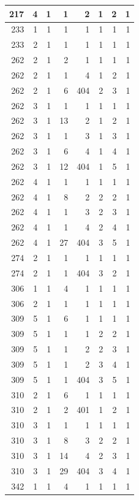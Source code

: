 \documentclass[11pt,]{book}
\begin{document}
\begin{table}
\begin{tabular}[t]{r|r|r|r|r|r|r|r}
\hline
217 & 4 & 1 & 1 & 2 & 1 & 2 & 1\\
\hline
233 & 1 & 1 & 1 & 1 & 1 & 1 & 1\\
\hline
233 & 2 & 1 & 1 & 1 & 1 & 1 & 1\\
\hline
262 & 2 & 1 & 2 & 1 & 1 & 1 & 1\\
\hline
262 & 2 & 1 & 1 & 4 & 1 & 2 & 1\\
\hline
262 & 2 & 1 & 6 & 404 & 2 & 3 & 1\\
\hline
262 & 3 & 1 & 1 & 1 & 1 & 1 & 1\\
\hline
262 & 3 & 1 & 13 & 2 & 1 & 2 & 1\\
\hline
262 & 3 & 1 & 1 & 3 & 1 & 3 & 1\\
\hline
262 & 3 & 1 & 6 & 4 & 1 & 4 & 1\\
\hline
262 & 3 & 1 & 12 & 404 & 1 & 5 & 1\\
\hline
262 & 4 & 1 & 1 & 1 & 1 & 1 & 1\\
\hline
262 & 4 & 1 & 8 & 2 & 2 & 2 & 1\\
\hline
262 & 4 & 1 & 1 & 3 & 2 & 3 & 1\\
\hline
262 & 4 & 1 & 1 & 4 & 2 & 4 & 1\\
\hline
262 & 4 & 1 & 27 & 404 & 3 & 5 & 1\\
\hline
274 & 2 & 1 & 1 & 1 & 1 & 1 & 1\\
\hline
274 & 2 & 1 & 1 & 404 & 3 & 2 & 1\\
\hline
306 & 1 & 1 & 4 & 1 & 1 & 1 & 1\\
\hline
306 & 2 & 1 & 1 & 1 & 1 & 1 & 1\\
\hline
309 & 5 & 1 & 6 & 1 & 1 & 1 & 1\\
\hline
309 & 5 & 1 & 1 & 1 & 2 & 2 & 1\\
\hline
309 & 5 & 1 & 1 & 2 & 2 & 3 & 1\\
\hline
309 & 5 & 1 & 1 & 2 & 3 & 4 & 1\\
\hline
309 & 5 & 1 & 1 & 404 & 3 & 5 & 1\\
\hline
310 & 2 & 1 & 6 & 1 & 1 & 1 & 1\\
\hline
310 & 2 & 1 & 2 & 401 & 1 & 2 & 1\\
\hline
310 & 3 & 1 & 1 & 1 & 1 & 1 & 1\\
\hline
310 & 3 & 1 & 8 & 3 & 2 & 2 & 1\\
\hline
310 & 3 & 1 & 14 & 4 & 2 & 3 & 1\\
\hline
310 & 3 & 1 & 29 & 404 & 3 & 4 & 1\\
\hline
342 & 1 & 1 & 4 & 1 & 1 & 1 & 1\\

\end{tabular}
\end{table}
\end{document}
